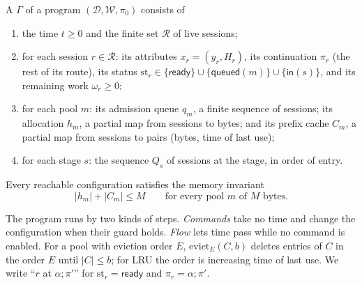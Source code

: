 \begin{definition}[Configuration]\label{L1:def:config}
A  $\Gamma$ of a program $(\mathcal D,\mathcal W,\pi_0)$ consists of
\begin{enumerate}[label=(\alph*)]
\item the time $t\ge0$ and the finite set $\mathcal R$ of live sessions;
\item for each session $r\in\mathcal R$: its attributes $x_r=(y_r,H_r)$, its
  continuation $\pi_r$ (the rest of its route), its status
  $\mathrm{st}_r\in\{\mathsf{ready}\}\cup\{\mathsf{queued}(m)\}\cup\{\mathsf{in}(s)\}$,
  and its remaining work $\omega_r\ge0$;
\item for each pool $m$: its admission queue $q_m$, a finite sequence of sessions; its
  allocation $h_m$, a partial map from sessions to bytes; and its prefix cache $C_m$, a
  partial map from sessions to pairs (bytes, time of last use);
\item for each stage $s$: the sequence $Q_s$ of sessions at the stage, in order of
  entry.
\end{enumerate}
Every reachable configuration satisfies the memory invariant
\begin{equation}\label{L1:eq:invariant}
  |h_m|+|C_m|\le M\qquad\text{for every pool } m \text{ of } M \text{ bytes}.
\end{equation}
\end{definition}

The program runs by two kinds of steps. \emph{Commands} take no time and change the
configuration when their guard holds. \emph{Flow} lets time pass while no command is
enabled. For a pool with eviction order $E$, $\mathrm{evict}_E(C,b)$ deletes entries of
$C$ in the order $E$ until $|C|\le b$; for LRU the order is increasing time of last use.
We write ``$r$ at $\alpha;\pi'$'' for $\mathrm{st}_r=\mathsf{ready}$ and
$\pi_r=\alpha;\pi'$.

